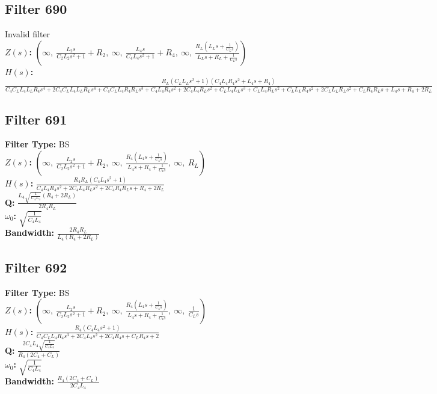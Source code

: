 \documentclass{article}
\begin{document}
\subsection*{Filter 690}
Invalid filter \\ 
\textbf{$Z(s)$:} $\left( \infty, \  \frac{L_{2} s}{C_{2} L_{2} s^{2} + 1} + R_{2}, \  \infty, \  \frac{L_{4} s}{C_{4} L_{4} s^{2} + 1} + R_{4}, \  \infty, \  \frac{R_{L} \left(L_{L} s + \frac{1}{C_{L} s}\right)}{L_{L} s + R_{L} + \frac{1}{C_{L} s}}\right)$ \\ 
\textbf{$H(s)$:} $\frac{R_{L} \left(C_{L} L_{L} s^{2} + 1\right) \left(C_{4} L_{4} R_{4} s^{2} + L_{4} s + R_{4}\right)}{C_{4} C_{L} L_{4} L_{L} R_{4} s^{4} + 2 C_{4} C_{L} L_{4} L_{L} R_{L} s^{4} + C_{4} C_{L} L_{4} R_{4} R_{L} s^{3} + C_{4} L_{4} R_{4} s^{2} + 2 C_{4} L_{4} R_{L} s^{2} + C_{L} L_{4} L_{L} s^{3} + C_{L} L_{4} R_{L} s^{2} + C_{L} L_{L} R_{4} s^{2} + 2 C_{L} L_{L} R_{L} s^{2} + C_{L} R_{4} R_{L} s + L_{4} s + R_{4} + 2 R_{L}}$ \\ 
\subsection*{Filter 691}
\textbf{Filter Type:} BS \\ 
\textbf{$Z(s)$:} $\left( \infty, \  \frac{L_{2} s}{C_{2} L_{2} s^{2} + 1} + R_{2}, \  \infty, \  \frac{R_{4} \left(L_{4} s + \frac{1}{C_{4} s}\right)}{L_{4} s + R_{4} + \frac{1}{C_{4} s}}, \  \infty, \  R_{L}\right)$ \\ 
\textbf{$H(s)$:} $\frac{R_{4} R_{L} \left(C_{4} L_{4} s^{2} + 1\right)}{C_{4} L_{4} R_{4} s^{2} + 2 C_{4} L_{4} R_{L} s^{2} + 2 C_{4} R_{4} R_{L} s + R_{4} + 2 R_{L}}$ \\ 
\textbf{Q:} $\frac{L_{4} \sqrt{\frac{1}{C_{4} L_{4}}} \left(R_{4} + 2 R_{L}\right)}{2 R_{4} R_{L}}$ \\ 
\textbf{$\omega_0$:} $\sqrt{\frac{1}{C_{4} L_{4}}}$ \\ 
\textbf{Bandwidth:} $\frac{2 R_{4} R_{L}}{L_{4} \left(R_{4} + 2 R_{L}\right)}$ \\ 
\subsection*{Filter 692}
\textbf{Filter Type:} BS \\ 
\textbf{$Z(s)$:} $\left( \infty, \  \frac{L_{2} s}{C_{2} L_{2} s^{2} + 1} + R_{2}, \  \infty, \  \frac{R_{4} \left(L_{4} s + \frac{1}{C_{4} s}\right)}{L_{4} s + R_{4} + \frac{1}{C_{4} s}}, \  \infty, \  \frac{1}{C_{L} s}\right)$ \\ 
\textbf{$H(s)$:} $\frac{R_{4} \left(C_{4} L_{4} s^{2} + 1\right)}{C_{4} C_{L} L_{4} R_{4} s^{3} + 2 C_{4} L_{4} s^{2} + 2 C_{4} R_{4} s + C_{L} R_{4} s + 2}$ \\ 
\textbf{Q:} $\frac{2 C_{4} L_{4} \sqrt{\frac{1}{C_{4} L_{4}}}}{R_{4} \left(2 C_{4} + C_{L}\right)}$ \\ 
\textbf{$\omega_0$:} $\sqrt{\frac{1}{C_{4} L_{4}}}$ \\ 
\textbf{Bandwidth:} $\frac{R_{4} \left(2 C_{4} + C_{L}\right)}{2 C_{4} L_{4}}$ \\ 
\end{document}
